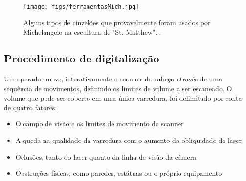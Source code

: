 



\begin{figure}[!h]
	\centering
	\texttt{[image: figs/ferramentasMich.jpg]}
	\caption{%
	Alguns tipos de cinzelões que provavelmente foram usados por Michelangelo na escultura de "St. Matthew".
	\protect\cite{levoy2000digital}.
	}\label{fig:noite}
\end{figure}

\subsection*{Procedimento de digitalização}

Um operador move, interativamente o scanner da cabeça através de uma sequência de movimentos, definindo os limites de volume a ser escaneado. O volume que pode ser coberto em uma única varredura, foi delimitado por conta de quatro fatores:
\begin{itemize}
\item{O campo de visão e os limites de movimento do scanner}
\item{A  queda na qualidade da varredura com o aumento da obliquidade do laser}
\item{Oclusões, tanto do laser quanto da linha de visão da câmera}
\item{Obstruções físicas, como paredes, estátuas ou o próprio equipamento}
\end{itemize}

